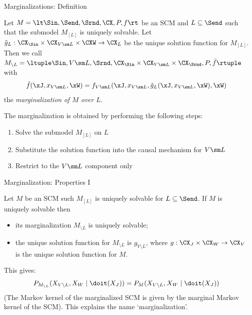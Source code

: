 \begin{frame}{Marginalizations: Definition}
  \begin{Def}[\ref{def:scm_marginalization}]
  Let $M = \lt \Sin, \Send, \Srnd, \CX, P, f \rt$ be an SCM and $L \subseteq \Send$ such that
  the submodel $M_{[L]}$ is uniquely solvable.
  Let $\tilde{g}_L : \CX_{\Sin} \times \CX_{V \sm L} \times \CXW \to \CX_L$
  be the unique solution function for $M_{[L]}$.
  Then we call $M_{\setminus L} = \ltuple \Sin, V \sm L, \Srnd, \CX_{\Sin} \times \CX_{V \sm L} \times \CX_{\Srnd}, P, \tilde{f} \rtuple$ with
  $$\tilde{f}(\xJ,x_{V \sm L},\xW) = f_{V \sm L}(\xJ,x_{V \sm L},\tilde{g}_L(\xJ,x_{V \sm L},\xW),\xW)$$
  the \emph{marginalization of $M$ over $L$}.
\end{Def}
The marginalization is obtained by performing the following steps:
  \begin{enumerate}
    \item Solve the submodel $M_{[L]}$ on $L$
    \item Substitute the solution function into the causal mechanism for $V \sm L$
    \item Restrict to the $V \sm L$ component only
  \end{enumerate}
\end{frame}

\begin{frame}{Marginalization: Properties I}
  \begin{Lem}[\ref{lem:marginalization_preserves_unique_solvability}]
  Let $M$ be an SCM such $M_{[L]}$ is uniquely solvable for $L \subseteq \Send$.
  If $M$ is uniquely solvable then 
  \begin{itemize}
    \item its marginalization $M_{\setminus L}$ is uniquely solvable; 
    \item the unique solution function for $M_{\setminus L}$ is $g_{V\setminus L}$, where 
  $g : \CX_J \times \CX_W \to \CX_V$ is the unique solution function for $M$.
  \end{itemize}
\end{Lem}

This gives:
$$P_{M_{\setminus L}}(X_{V\setminus L},X_W \mid \doit(X_J)) = P_{M}(X_{V\setminus L},X_W \mid \doit(X_J))$$
(The Markov kernel of the marginalized SCM is given by the marginal Markov kernel of the SCM).
This explains the name `marginalization'.
\end{frame}
  
